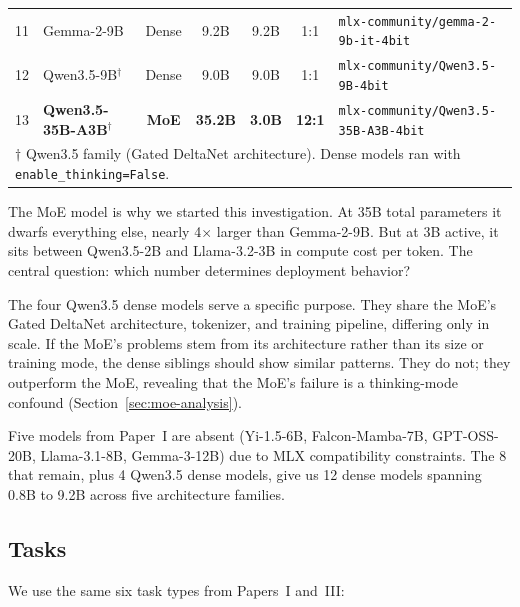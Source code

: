 \documentclass[11pt]{article}
\begin{document}
\begin{table}[t]
\begin{tabular}{llccccl}
11 & Gemma-2-9B & Dense & 9.2B & 9.2B & 1:1 & \texttt{mlx-community/gemma-2-9b-it-4bit} \\
12 & Qwen3.5-9B$^\dagger$ & Dense & 9.0B & 9.0B & 1:1 & \texttt{mlx-community/Qwen3.5-9B-4bit} \\
\midrule
13 & \textbf{Qwen3.5-35B-A3B}$^\dagger$ & \textbf{MoE} & \textbf{35.2B} & \textbf{3.0B} & \textbf{12:1} & \texttt{mlx-community/Qwen3.5-35B-A3B-4bit} \\
\bottomrule
\multicolumn{7}{l}{\footnotesize $\dagger$ Qwen3.5 family (Gated DeltaNet architecture).  Dense models ran with \texttt{enable\_thinking=False}.} \\
\end{tabular}
\end{table}

The MoE model is why we started this investigation.  At 35B total parameters it dwarfs everything else, nearly 4$\times$ larger than Gemma-2-9B.  But at 3B active, it sits between Qwen3.5-2B and Llama-3.2-3B in compute cost per token.  The central question: which number determines deployment behavior?

The four Qwen3.5 dense models serve a specific purpose.  They share the MoE's Gated DeltaNet architecture, tokenizer, and training pipeline, differing only in scale.  If the MoE's problems stem from its architecture rather than its size or training mode, the dense siblings should show similar patterns.  They do not; they outperform the MoE, revealing that the MoE's failure is a thinking-mode confound (Section~\ref{sec:moe-analysis}).

Five models from Paper~I are absent (Yi-1.5-6B, Falcon-Mamba-7B, GPT-OSS-20B, Llama-3.1-8B, Gemma-3-12B) due to MLX compatibility constraints.  The 8 that remain, plus 4 Qwen3.5 dense models, give us 12 dense models spanning 0.8B to 9.2B across five architecture families.

\subsection{Tasks}
\label{sec:tasks}

We use the same six task types from Papers~I and~III:
\end{document}
